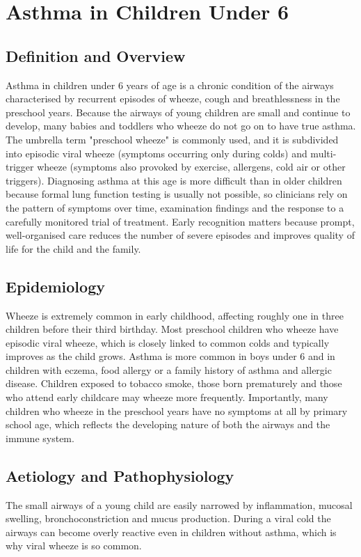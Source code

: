 \chapter{Asthma in Children Under 6}

\section*{Definition and Overview}
Asthma in children under 6 years of age is a chronic condition of the airways characterised by recurrent episodes of wheeze, cough and breathlessness in the preschool years. Because the airways of young children are small and continue to develop, many babies and toddlers who wheeze do not go on to have true asthma. The umbrella term "preschool wheeze" is commonly used, and it is subdivided into episodic viral wheeze (symptoms occurring only during colds) and multi-trigger wheeze (symptoms also provoked by exercise, allergens, cold air or other triggers). Diagnosing asthma at this age is more difficult than in older children because formal lung function testing is usually not possible, so clinicians rely on the pattern of symptoms over time, examination findings and the response to a carefully monitored trial of treatment. Early recognition matters because prompt, well-organised care reduces the number of severe episodes and improves quality of life for the child and the family.

\section*{Epidemiology}
Wheeze is extremely common in early childhood, affecting roughly one in three children before their third birthday. Most preschool children who wheeze have episodic viral wheeze, which is closely linked to common colds and typically improves as the child grows. Asthma is more common in boys under 6 and in children with eczema, food allergy or a family history of asthma and allergic disease. Children exposed to tobacco smoke, those born prematurely and those who attend early childcare may wheeze more frequently. Importantly, many children who wheeze in the preschool years have no symptoms at all by primary school age, which reflects the developing nature of both the airways and the immune system.

\section*{Aetiology and Pathophysiology}
The small airways of a young child are easily narrowed by inflammation, mucosal swelling, bronchoconstriction and mucus production. During a viral cold the airways can become overly reactive even in children without asthma, which is why viral wheeze is so common.

